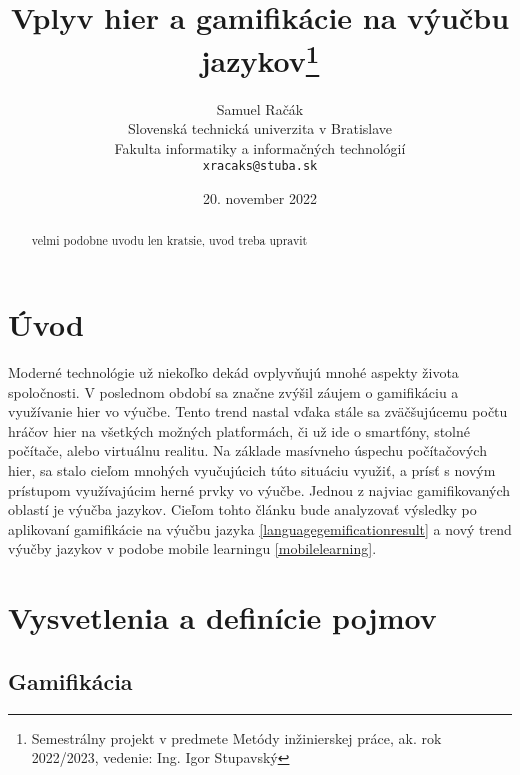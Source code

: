 \documentclass[10pt,slovak,a4paper]{article}
\title{Vplyv hier a gamifikácie na výučbu jazykov\thanks{Semestrálny projekt v predmete Metódy inžinierskej práce, ak. rok 2022/2023, vedenie: Ing. Igor Stupavský}}
\author{Samuel Račák\\[2pt]
	{\small Slovenská technická univerzita v Bratislave}\\
	{\small Fakulta informatiky a informačných technológií}\\
	{\small \texttt{xracaks@stuba.sk}}
	}
\date{\small 20. november 2022} %
\begin{document}
\maketitle

\begin{abstract}
    velmi podobne uvodu len kratsie, uvod treba upravit
\end{abstract}
\section{Úvod} \label{uvod}

Moderné technológie už niekoľko dekád ovplyvňujú mnohé aspekty života spoločnosti. V poslednom období sa značne zvýšil záujem o gamifikáciu a využívanie hier vo výučbe. Tento trend nastal vďaka stále sa zväčšujúcemu počtu hráčov hier na všetkých možných platformách, či už ide o smartfóny, stolné počítače, alebo virtuálnu realitu. Na základe masívneho úspechu počítačových hier, sa stalo cieľom mnohých vyučujúcich túto situáciu využiť, a prísť s novým prístupom využívajúcim herné prvky vo výučbe.
Jednou z najviac gamifikovaných oblastí je výučba jazykov. Cieľom tohto článku bude analyzovať výsledky po aplikovaní gamifikácie na výučbu jazyka \ref{languagegemificationresult} a nový trend výučby jazykov v podobe mobile learningu \ref{mobilelearning}.


\section{Vysvetlenia a definície pojmov} \label{definitions}

\subsection{Gamifikácia} \label{gamification}
\end{document}
